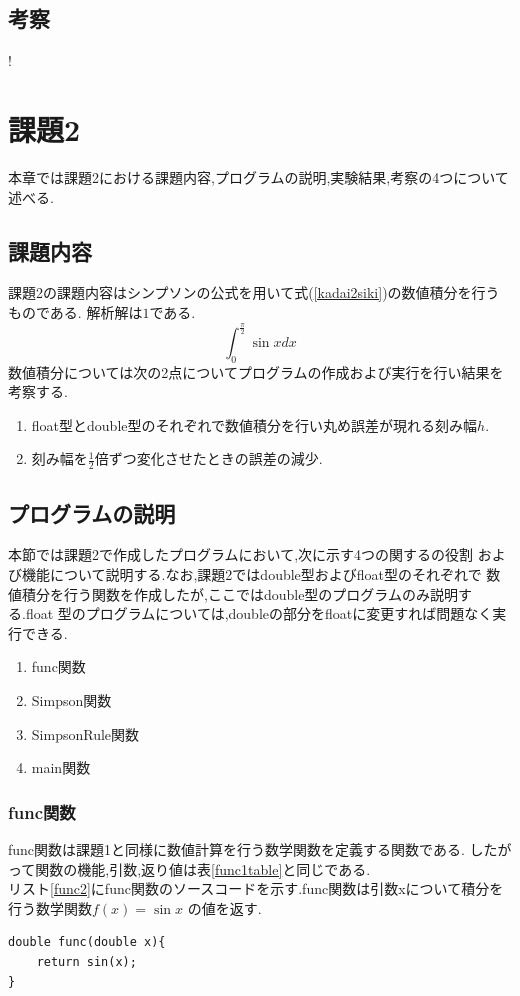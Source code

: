\documentclass[dvipdfmx]{jarticle}
\begin{document}
    \subsection{考察}
    !
    \section{課題2}
    本章では課題2における課題内容,プログラムの説明,実験結果,考察の4つについて述べる.
    \subsection{課題内容}
    課題2の課題内容はシンプソンの公式を用いて式(\ref{kadai2siki})の数値積分を行うものである.
    解析解は$1$である.
    \begin{equation}
      \int_0^\frac{\pi}{2} \sin x dx
          \label{kadai2siki}
        \end{equation}
    数値積分については次の2点についてプログラムの作成および実行を行い結果を考察する.
    \begin{enumerate}
      \item float型とdouble型のそれぞれで数値積分を行い丸め誤差が現れる刻み幅$h$.
      \item 刻み幅を$\frac{1}{2}$倍ずつ変化させたときの誤差の減少.
      \end{enumerate}

    \subsection{プログラムの説明}
    本節では課題2で作成したプログラムにおいて,次に示す4つの関するの役割
    および機能について説明する.なお,課題2ではdouble型およびfloat型のそれぞれで
    数値積分を行う関数を作成したが,ここではdouble型のプログラムのみ説明する.float
    型のプログラムについては,doubleの部分をfloatに変更すれば問題なく実行できる.
    \begin{enumerate}
      \item func関数
      \item Simpson関数
      \item SimpsonRule関数
      \item main関数
      \end{enumerate}
    
    \subsubsection{func関数}
    func関数は課題1と同様に数値計算を行う数学関数を定義する関数である.
    したがって関数の機能,引数,返り値は表\ref{func1table}と同じである.\\
      リスト\ref{func2}にfunc関数のソースコードを示す.func関数は引数xについて積分を行う数学関数$f(x)=\sin x$
      の値を返す.
      \begin{lstlisting}[basicstyle=\ttfamily\footnotesize, frame=single,label=func2,caption=func関数]
double func(double x){
    return sin(x);
} 
            \end{lstlisting}
\end{document}
